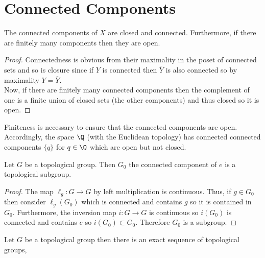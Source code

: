 \documentclass[12pt]{extarticle}
\begin{document}
\section{Connected Components}

\begin{proposition}
The connected components of $X$ are closed and connected. Furthermore, if there are finitely many components then they are open.
\end{proposition}

\begin{proof}
Connectedness is obvious from their maximality in the poset of connected sets and so is closure since if $Y$ is connected then $\overline{Y}$ is also connected so by maximality $Y = \overline{Y}$. 
\bigskip\\
Now, if there are finitely many connected components then the complement of one is a finite union of closed sets (the other components) and thus closed so it is open.
\end{proof}

\begin{remark}
Finiteness is necessary to ensure that the connected components are open. Accordingly, the space $\Q$ (with the Euclidean topology) has connected connected components $\{ q \}$ for $q \in \Q$ which are open but not closed. 
\end{remark}


\begin{proposition}
Let $G$ be a topological group. Then $G_0$ the connected component of $e$ is a topological subgroup. 
\end{proposition}

\begin{proof}
The map $\ell_g : G \to G$ by left multiplication is continuous. Thus, if $g \in G_0$ then consider $\ell_{g}(G_0)$ which is connected and contains $g$ so it is contained in $G_0$. Furthermore, the inversion map $i : G \to G$ is continuous so $i(G_0)$ is connected and contains $e$ so $i(G_0) \subset G_0$. Therefore $G_0$ is a subgroup. 
\end{proof}

\begin{proposition}
Let $G$ be a topological group then there is an exact sequence of topological groups,
\begin{center}
\end{center}
\end{proposition}
\end{document}

